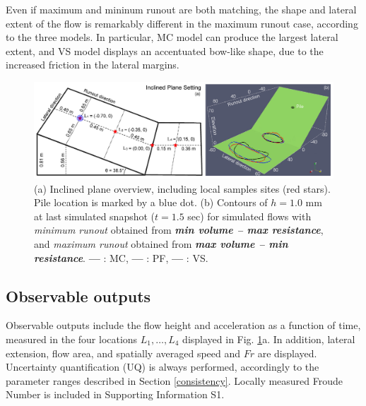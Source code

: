 \documentclass{article}
\begin{document}

Even if maximum and mininum runout are both matching, the shape and lateral extent of the flow is remarkably different in the maximum runout case, according to the three models. In particular, MC model can produce the largest lateral extent, and VS model displays an accentuated bow-like shape, due to the increased friction in the lateral margins.

\begin{figure}[H]
    \includegraphics[width=1\textwidth]{InclinedPlane/InclPlane_new.jpg}
    \centering
    \caption{(a) Inclined plane overview, including local samples sites (red stars). Pile location is marked by a blue dot. (b) Contours of $h = 1.0$ mm at last simulated snapshot ($t = 1.5$ sec) for simulated flows with \emph{minimum runout} obtained from \emph{\textbf{min volume -- max resistance}}, and \emph{maximum runout} obtained from \emph{\textbf{max volume -- min resistance}}. {\color{red} \textbf{---}} : MC, {\color{blue} \textbf{---}} : PF, \textbf{---} : VS.} \label{fig:Ramp-first}
\end{figure}

\subsection{Observable outputs} \label{Obs1}
Observable outputs include the flow height and acceleration as a function of time, measured in the four locations $L_1,\dots, L_4$ displayed in Fig. \ref{fig:Ramp-first}a. In addition, lateral extension, flow area, and spatially averaged speed and $Fr$ are displayed. Uncertainty quantification (UQ) is always performed, accordingly to the parameter ranges described in Section \ref{consistency}. Locally measured Froude Number is included in Supporting Information S1.
\end{document}
